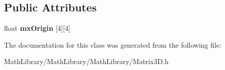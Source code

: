 \subsection*{Public Attributes}
\begin{DoxyCompactItemize}
\item 
\mbox{\label{classmatrix3_d_a10d9ec48ef10dd4447a9b1a8b96cd796}} 
float {\bfseries mx\+Origin} \mbox{[}4\mbox{]}\mbox{[}4\mbox{]}
\end{DoxyCompactItemize}


The documentation for this class was generated from the following file\+:\begin{DoxyCompactItemize}
\item 
Math\+Library/\+Math\+Library/\+Math\+Library/Matrix3\+D.\+h\end{DoxyCompactItemize}
